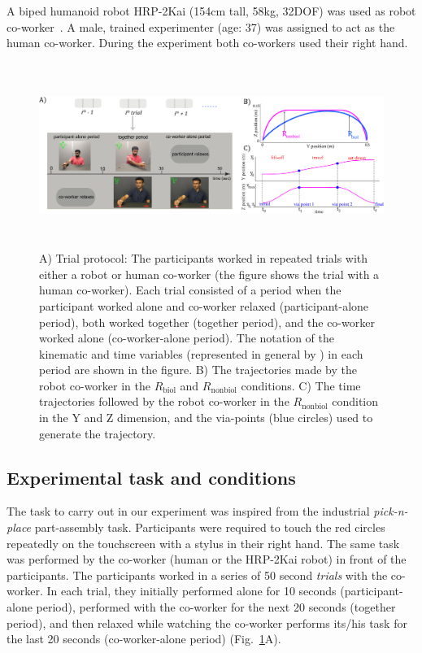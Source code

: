 A biped humanoid robot HRP-2Kai (154cm tall, 58kg, 32DOF) was used as robot co-worker~\cite{Kaneko:RAS_ICHR:2015}. A male, trained experimenter (age: 37) was assigned to act as the human co-worker. During the experiment both co-workers used their right hand.


\begin{figure}[phtb]
	\includegraphics[width=\textwidth,height=6cm]{plots/c2-plots/trialprotocol}
	\caption{A) Trial protocol: The participants worked in repeated trials with either a robot or human co-worker (the figure shows the trial with a human co-worker). Each trial consisted of a period when the participant worked alone and co-worker relaxed (participant-alone period), both worked together (together period), and the co-worker worked alone (co-worker-alone period). The notation of the kinematic and time variables (represented in general by \boldmath{$\eta$}) in each period are shown in the figure. B) The trajectories made by the robot co-worker in the $\textit{R}_{\text{biol}}$ and $\textit{R}_{\text{nonbiol}}$ conditions. C) The time trajectories followed by the robot co-worker in the $\textit{R}_{\text{nonbiol}}$ condition in the Y and Z dimension, and the via-points (blue circles) used to generate the trajectory.}
	\label{fig:trial}
\end{figure}

\subsection{Experimental task and conditions}

The task to carry out in our experiment was inspired from the industrial \textit{pick-n-place} part-assembly task. Participants were required to touch the red circles repeatedly on the touchscreen with a stylus in their right hand. The same task was performed by the co-worker (human or the HRP-2Kai robot) in front of the participants. The participants worked in a series of 50 second \textit{trials} with the co-worker. In each trial, they initially performed alone for 10 seconds (participant-alone period), performed with the co-worker for the next 20 seconds (together period), and then relaxed while watching the co-worker performs its/his task for the last 20 seconds (co-worker-alone period) (Fig.~\ref{fig:trial}A).


